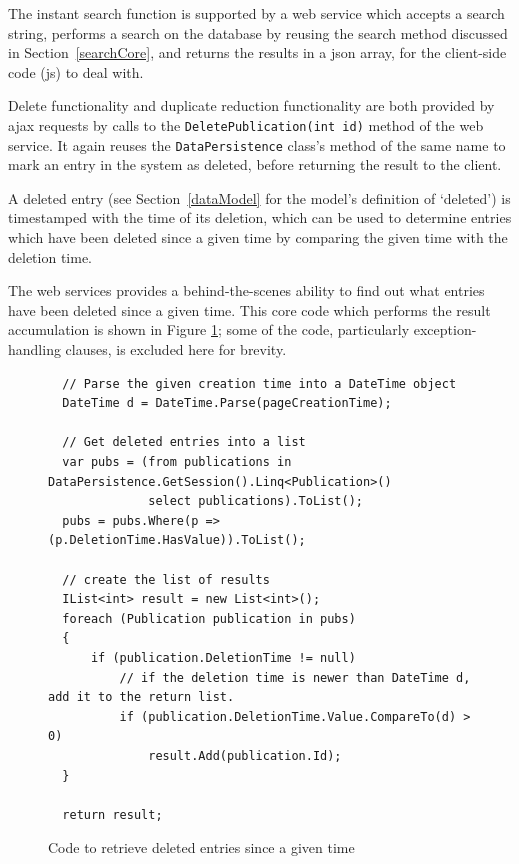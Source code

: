 The instant search function is supported by a web service which accepts a search string, performs a search on the database by reusing the search method discussed in Section~\ref{searchCore}, and returns the results in a \gls{json} array, for the client-side code (\gls{js}) to deal with.  

Delete functionality and duplicate reduction functionality are both provided by \gls{ajax} requests by calls to the \texttt{DeletePublication(int id)} method of the web service.  It again reuses the \texttt{DataPersistence} class's method of the same name to mark an entry in the system as deleted, before returning the result to the client.

A deleted entry (see Section~\ref{dataModel} for the model's definition of `deleted') is timestamped with the time of its deletion, which can be used to determine entries which have been deleted since a given time by comparing the given time with the deletion time. 

The web services provides a behind-the-scenes ability to find out what entries have been deleted since a given time.  This core code which performs the result accumulation is shown in Figure \ref{fig:getDeletedPublicationsWS}; some of the code, particularly exception-handling clauses, is excluded here for brevity.

\begin{figure}
	\begin{center}
			\lstset{language=CSharp} 
			\begin{lstlisting}
  // Parse the given creation time into a DateTime object
  DateTime d = DateTime.Parse(pageCreationTime);

  // Get deleted entries into a list
  var pubs = (from publications in DataPersistence.GetSession().Linq<Publication>()
              select publications).ToList();
  pubs = pubs.Where(p => (p.DeletionTime.HasValue)).ToList();

  // create the list of results
  IList<int> result = new List<int>();
  foreach (Publication publication in pubs)
  {
      if (publication.DeletionTime != null)
          // if the deletion time is newer than DateTime d, add it to the return list.
          if (publication.DeletionTime.Value.CompareTo(d) > 0)
              result.Add(publication.Id);
  }

  return result;
			\end{lstlisting}
		\caption{Code to retrieve deleted entries since a given time}
		\label{fig:getDeletedPublicationsWS}
	\end{center}
\end{figure}

